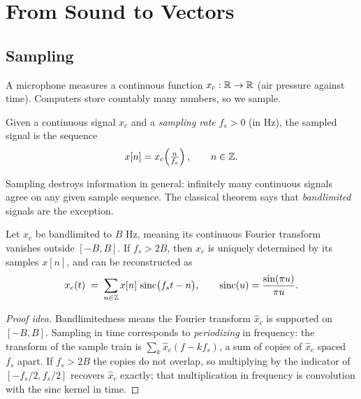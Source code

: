 \chapter{From Sound to Vectors}\label{ch:sound}

\section{Sampling}

A microphone measures a continuous function $x_c : \mathbb{R} \to \mathbb{R}$ (air pressure
against time). Computers store countably many numbers, so we sample.

\begin{definition}[Sampling]\label{def:sampling}
Given a continuous signal $x_c$ and a \emph{sampling rate} $f_s > 0$ (in Hz),
the sampled signal is the sequence
\[
x[n] = x_c\!\left(\tfrac{n}{f_s}\right), \qquad n \in \mathbb{Z} .
\]
\end{definition}

Sampling destroys information in general: infinitely many continuous signals
agree on any given sample sequence. The classical theorem says that
\emph{bandlimited} signals are the exception.

\begin{theorem}\label{thm:nyquist}
Let $x_c$ be bandlimited to $B$ Hz, meaning its continuous Fourier transform
vanishes outside $[-B, B]$. If $f_s > 2B$, then $x_c$ is uniquely determined
by its samples $x[n]$, and can be reconstructed as
\[
x_c(t) \;=\; \sum_{n \in \mathbb{Z}} x[n] \,
\operatorname{sinc}\!\big(f_s t - n\big),
\qquad \operatorname{sinc}(u) = \frac{\sin(\pi u)}{\pi u}.
\]
\end{theorem}

\begin{proof}[Proof idea]
Bandlimitedness means the Fourier transform $\hat{x}_c$ is supported on
$[-B,B]$. Sampling in time corresponds to \emph{periodizing} in frequency:
the transform of the sample train is $\sum_k \hat{x}_c(f - k f_s)$, a sum of
copies of $\hat{x}_c$ spaced $f_s$ apart. If $f_s > 2B$ the copies do not
overlap, so multiplying by the indicator of $[-f_s/2, f_s/2]$ recovers
$\hat{x}_c$ exactly; that multiplication in frequency is convolution with the
sinc kernel in time.
\end{proof}

